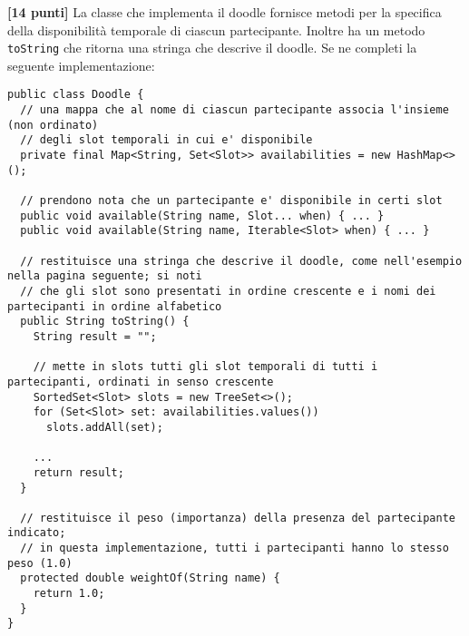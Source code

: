 \documentclass{article}[10pt]
\newcounter{esnu}
\newenvironment{esercizio}{\medskip \noindent {\bf Esercizio\addtocounter{esnu}{1} \arabic{esnu}}}{}
\begin{document}
\begin{esercizio}
\textbf{[14 punti]}
La classe che implementa il doodle fornisce metodi per la specifica della disponibilit\`a temporale di
ciascun partecipante. Inoltre ha un metodo \texttt{toString} che ritorna una
stringa che descrive il doodle. Se ne completi la seguente implementazione:

{\small\begin{verbatim}
public class Doodle {
  // una mappa che al nome di ciascun partecipante associa l'insieme (non ordinato)
  // degli slot temporali in cui e' disponibile
  private final Map<String, Set<Slot>> availabilities = new HashMap<>();

  // prendono nota che un partecipante e' disponibile in certi slot
  public void available(String name, Slot... when) { ... }
  public void available(String name, Iterable<Slot> when) { ... }

  // restituisce una stringa che descrive il doodle, come nell'esempio nella pagina seguente; si noti
  // che gli slot sono presentati in ordine crescente e i nomi dei partecipanti in ordine alfabetico
  public String toString() {
    String result = "";

    // mette in slots tutti gli slot temporali di tutti i partecipanti, ordinati in senso crescente
    SortedSet<Slot> slots = new TreeSet<>();
    for (Set<Slot> set: availabilities.values())
      slots.addAll(set);

    ...
    return result;
  }

  // restituisce il peso (importanza) della presenza del partecipante indicato;
  // in questa implementazione, tutti i partecipanti hanno lo stesso peso (1.0)
  protected double weightOf(String name) {
    return 1.0;
  }
}
\end{verbatim}}
  
\end{esercizio}
\end{document}
